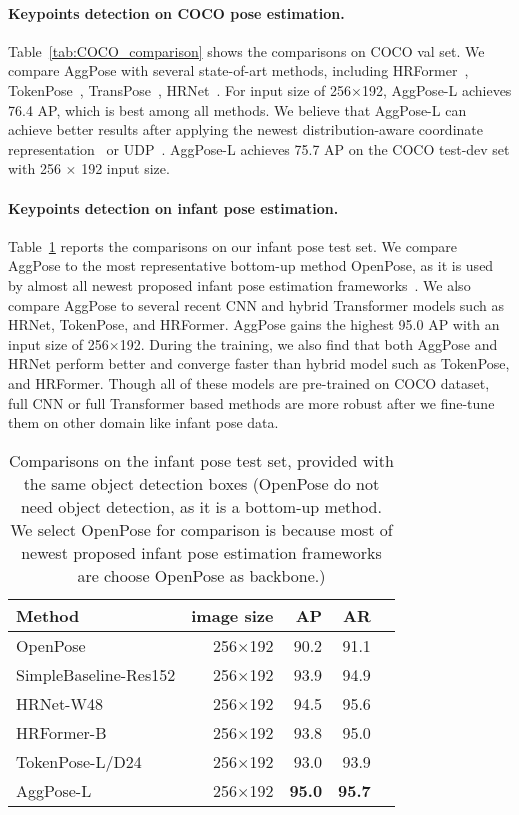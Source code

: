 \documentclass{article}
\begin{document}
\paragraph{Keypoints detection on COCO pose estimation.} Table~\ref{tab:COCO_comparison} shows the comparisons on COCO val set. We compare AggPose with several state-of-art methods, including HRFormer~\cite{yuan2021hrformer}, TokenPose~\cite{li2021tokenpose}, TransPose~\cite{yang2021transpose}, HRNet~\cite{wang2020deep}. For input size of 256$\times$192, AggPose-L achieves 76.4 AP, which is best among all methods. We believe that AggPose-L can achieve better results after applying the newest distribution-aware coordinate representation~\cite{zhang2020distribution} or UDP~\cite{huang2020devil}. AggPose-L achieves 75.7 AP on the COCO test-dev set with 256 $\times$ 192 input size. 

\paragraph{Keypoints detection on infant pose estimation.} Table~\ref{tab:infant_comparison} reports the comparisons on our infant pose test set. We compare AggPose to the most representative bottom-up method OpenPose, as it is used by almost all newest proposed infant pose estimation frameworks~\cite{silva2021future}. We also compare AggPose to several recent CNN and hybrid Transformer models such as HRNet, TokenPose, and HRFormer. AggPose gains the highest 95.0 AP with an input size of 256$\times$192. During the training, we also find that both AggPose and HRNet perform better and converge faster than hybrid model such as TokenPose, and HRFormer. Though all of these models are pre-trained on COCO dataset, full CNN or full Transformer based methods are more robust after we fine-tune them on other domain like infant pose data. 



\begin{table}
\centering
\begin{tabular}{lrrrr}
\toprule
Method  & image size  & AP  & AR\\
\midrule
OpenPose          & 256$\times$192  & 90.2  & 91.1      \\
SimpleBaseline-Res152  & 256$\times$192  & 93.9  & 94.9      \\
HRNet-W48         & 256$\times$192  & 94.5    & 95.6    \\
HRFormer-B        & 256$\times$192  & 93.8    & 95.0    \\
TokenPose-L/D24   & 256$\times$192  & 93.0     & 93.9    \\
AggPose-L         & 256$\times$192  & \textbf{95.0}     & \textbf{95.7}    \\
\bottomrule
\end{tabular}
\caption{Comparisons on the infant pose test set, provided with the same object detection boxes (OpenPose do not need object detection, as it is a bottom-up method. We select OpenPose for comparison is because most of newest proposed infant pose estimation frameworks are choose OpenPose as backbone.)}
\label{tab:infant_comparison}
\end{table}
\end{document}
